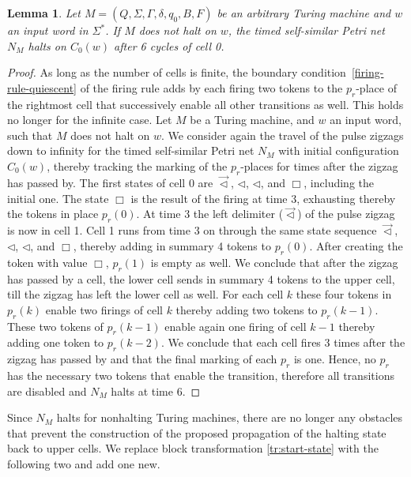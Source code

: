 \documentclass[pre,showpacs,showkeys,preprint]{revtex4}
\newtheorem{lemma}{Lemma}
\theoremstyle{definition}
\begin{document}
\begin{lemma}
\label{lemma:apn-halting}
Let $M = (Q, \Sigma, \Gamma, \delta, q_0, B, F)$ be an arbitrary Turing machine and $w$ an input word in $\Sigma^*$.
If $M$ does not halt on $w$, the timed self-similar Petri net $N_M$ halts on $C_0(w)$ after 6 cycles of cell 0.
\end{lemma}
\begin{proof}
As long as the number of cells is finite, the boundary condition~\ref{firing-rule-quiescent} of the firing rule adds by each firing
two tokens to the $p_r$-place of the rightmost cell that successively enable all other transitions as well.
This holds no longer for the infinite case.
Let $M$ be a Turing machine, and $w$ an input word, such that $M$ does not halt on $w$.
We consider again the travel of the pulse zigzags down to infinity for the timed self-similar Petri net $N_M$ with
initial configuration $C_0(w)$, thereby tracking the marking of the $p_r$-places
for times after the zigzag has passed by.
The first states of cell $0$ are $\overrightarrow{\lhd}$, $\lhd$, $\lhd$, and $\Box$, including the initial one.
The state $\Box$ is the result of the firing at time 3, exhausting thereby the tokens in place $p_r(0)$.
At time 3 the left delimiter ($\overrightarrow{\lhd}$) of the pulse zigzag is now in cell 1.
Cell 1 runs from time 3 on through the same state sequence $\overrightarrow{\lhd}$, $\lhd$, $\lhd$, and $\Box$,
thereby adding in summary 4 tokens to $p_r(0)$.
After creating the token with value $\Box$, $p_r(1)$ is empty as well.
We conclude that after the zigzag has passed by a cell, the lower cell sends in summary 4 tokens to the upper cell,
till the zigzag has left the lower cell as well.
For each cell $k$ these four tokens in $p_r(k)$ enable two firings of cell $k$ thereby adding two tokens
to $p_r(k-1)$.
These two tokens of $p_r(k-1)$ enable again one firing of cell $k-1$ thereby adding one token to $p_r(k-2)$.
We conclude that each cell fires 3 times after the zigzag has passed by and that the final marking of each $p_r$ is one.
Hence, no $p_r$ has the necessary two tokens that enable the transition, therefore all transitions are disabled
and $N_M$ halts at time 6.
\end{proof}

Since $N_M$ halts for nonhalting Turing machines, there are no longer any obstacles that prevent
the construction of the proposed propagation of the halting state back to upper cells.
We replace block transformation \ref{tr:start-state} with the following two and add one new.
\end{document}
